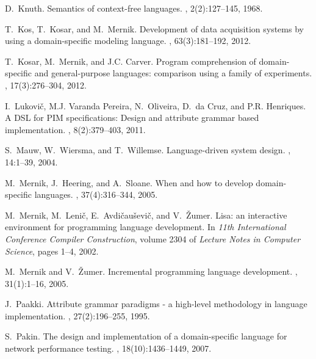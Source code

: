 \documentclass[preprint, prX]{revtex4}
\begin{document}
\begin{thebibliography}{10}
D.~Knuth.
\newblock Semantics of context-free languages.
, 2(2):127--145, 1968.

T.~Kos, T.~Kosar, and M.~Mernik.
\newblock Development of data acquisition systems by using a domain-specific
  modeling language.
, 63(3):181--192, 2012.

T.~Kosar, M.~Mernik, and J.C. Carver.
\newblock Program comprehension of domain-specific and general-purpose
  languages: comparison using a family of experiments.
, 17(3):276--304, 2012.

I.~Lukovi\v{c}, M.J. {Varanda Pereira}, N.~Oliveira, D.~{da Cruz}, and P.R.
  Henriques.
\newblock A {DSL} for {PIM} specifications: Design and attribute grammar based
  implementation.
, 8(2):379--403, 2011.

S.~Mauw, W.~Wiersma, and T.~Willemse.
\newblock Language-driven system design.
, 14:1--39, 2004.

M.~Mernik, J.~Heering, and A.~Sloane.
\newblock When and how to develop domain-specific languages.
, 37(4):316--344, 2005.

M.~Mernik, M.~Leni\v{c}, E.~Avdi\v{c}au\v{s}evi\v{c}, and V.~\v{Z}umer.
\newblock Lisa: an interactive environment for programming language
  development.
\newblock In {\em 11th International Conference Compiler Construction}, volume
  2304 of {\em Lecture Notes in Computer Science}, pages 1--4, 2002.

M.~Mernik and V.~\v{Z}umer.
\newblock Incremental programming language development.
, 31(1):1--16, 2005.

J.~Paakki.
\newblock Attribute grammar paradigms - a high-level methodology in language
  implementation.
, 27(2):196--255, 1995.

S.~Pakin.
\newblock The design and implementation of a domain-specific language for
  network performance testing.
,
  18(10):1436--1449, 2007.


\end{thebibliography}
\end{document}
